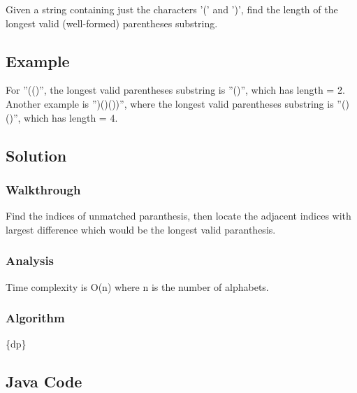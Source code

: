 \documentclass[]{book}
\begin{document}
Given a string containing just the characters '(' and ')', find the length of the longest valid (well-formed)
parentheses substring.

\hypertarget{example-26}{%
\subsection{Example}\label{example-26}}

For ''(()'', the longest valid parentheses substring is ''()'', which has length = 2.
Another example is '')()())'', where the longest valid parentheses substring is ''()()'', which has length = 4.

\hypertarget{solution-21}{%
\subsection{Solution}\label{solution-21}}

\hypertarget{walkthrough-25}{%
\subsubsection{Walkthrough}\label{walkthrough-25}}

Find the indices of unmatched paranthesis, then locate the adjacent indices with largest difference which would be
the longest valid paranthesis.

\hypertarget{analysis-28}{%
\subsubsection{Analysis}\label{analysis-28}}

Time complexity is O(n) where n is the number of alphabets.

\hypertarget{algorithm-28}{%
\subsubsection{Algorithm}\label{algorithm-28}}

\{dp\}

\hypertarget{java-code-24}{%
\subsection{Java Code}\label{java-code-24}}
\end{document}
